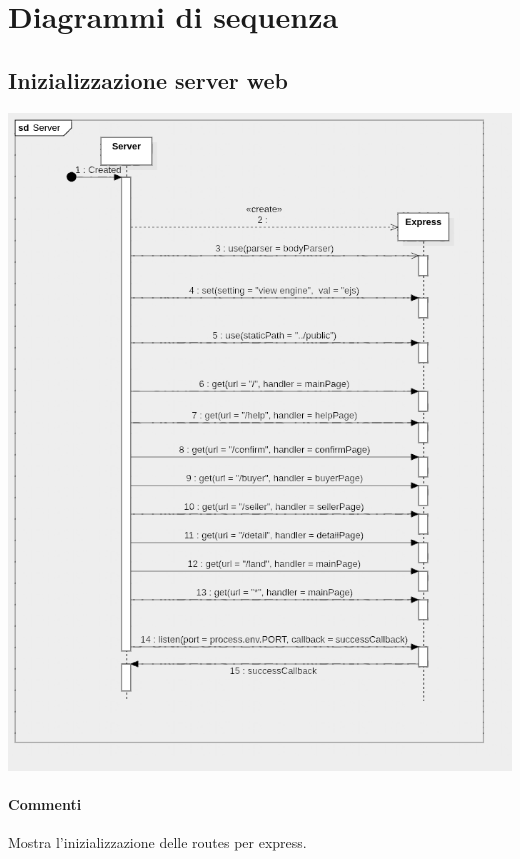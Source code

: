 \documentclass[a4paper, 12pt]{article}
\begin{document}
\section{Diagrammi di sequenza}
\subsection{Inizializzazione server web}
\includegraphics[width=1.0\textwidth]{server}
\paragraph{Commenti}
Mostra l'inizializzazione delle routes per express.
\end{document}
